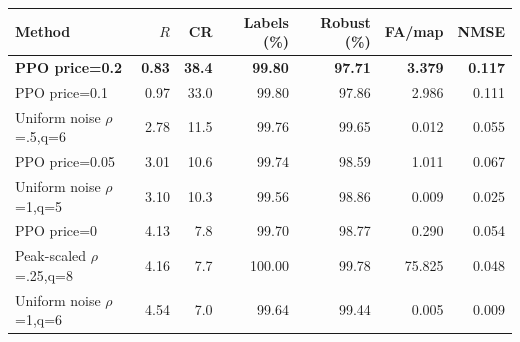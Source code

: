 \begin{tabular}{@{}lrrrrrr@{}}
\toprule
Method & $R$ & CR & Labels (\%) & Robust (\%) & FA/map & NMSE\\
\midrule
\textbf{PPO price=0.2} & \textbf{0.83} & \textbf{38.4} & \textbf{99.80} & \textbf{97.71} & \textbf{3.379} & \textbf{0.117}\\
PPO price=0.1 & 0.97 & 33.0 & 99.80 & 97.86 & 2.986 & 0.111\\
Uniform noise $\rho$=.5,q=6 & 2.78 & 11.5 & 99.76 & 99.65 & 0.012 & 0.055\\
PPO price=0.05 & 3.01 & 10.6 & 99.74 & 98.59 & 1.011 & 0.067\\
Uniform noise $\rho$=1,q=5 & 3.10 & 10.3 & 99.56 & 98.86 & 0.009 & 0.025\\
PPO price=0 & 4.13 & 7.8 & 99.70 & 98.77 & 0.290 & 0.054\\
Peak-scaled $\rho$=.25,q=8 & 4.16 & 7.7 & 100.00 & 99.78 & 75.825 & 0.048\\
Uniform noise $\rho$=1,q=6 & 4.54 & 7.0 & 99.64 & 99.44 & 0.005 & 0.009\\
\bottomrule
\end{tabular}
